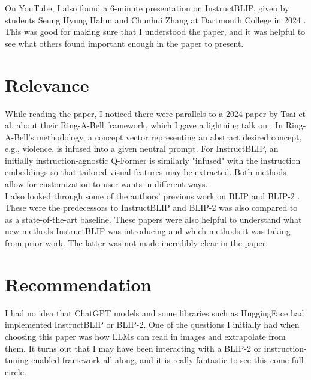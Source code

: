 \documentclass[12pt, letterpaper]{article}
\begin{document}
\begin{spacing}{1.10}
On YouTube, I also found a 6-minute presentation on InstructBLIP, given by students Seung Hyung Hahm and Chunhui Zhang at Dartmouth College in 2024 \cite{hahmzhang2024instructblip}. This was good for making sure that I understood the paper, and it was helpful to see what others found important enough in the paper to present.

\section{Relevance}
\label{sec:relevance}
\leavevmode\par\noindent
While reading the paper, I noticed there were parallels to a 2024 paper by Tsai et al. about their Ring-A-Bell framework, which I gave a lightning talk on \cite{tsai2024ringabellreliableconceptremoval}. In Ring-A-Bell's methodology, a concept vector representing an abstract desired concept, e.g., violence, is infused into a given neutral prompt. For InstructBLIP, an initially instruction-agnostic Q-Former is similarly "infused" with the instruction embeddings so that tailored visual features may be extracted. Both methods allow for customization to user wants in different ways.\\

I also looked through some of the authors' previous work on BLIP \cite{li2022blipbootstrappinglanguageimagepretraining} and BLIP-2 \cite{li2023blip2bootstrappinglanguageimagepretraining}. These were the predecessors to InstructBLIP and BLIP-2 was also compared to as a state-of-the-art baseline. These papers were also helpful to understand what new methods InstructBLIP was introducing and which methods it was taking from prior work. The latter was not made incredibly clear in the paper.

\section{Recommendation}
\label{sec:rec}
\leavevmode\par\noindent
I had no idea that ChatGPT models and some libraries such as HuggingFace had implemented InstructBLIP or BLIP-2. One of the questions I initially had when choosing this paper was how LLMs can read in images and extrapolate from them. It turns out that I may have been interacting with a BLIP-2 or instruction-tuning enabled framework all along, and it is really fantastic to see this come full circle.\\


\end{spacing}
\end{document}
